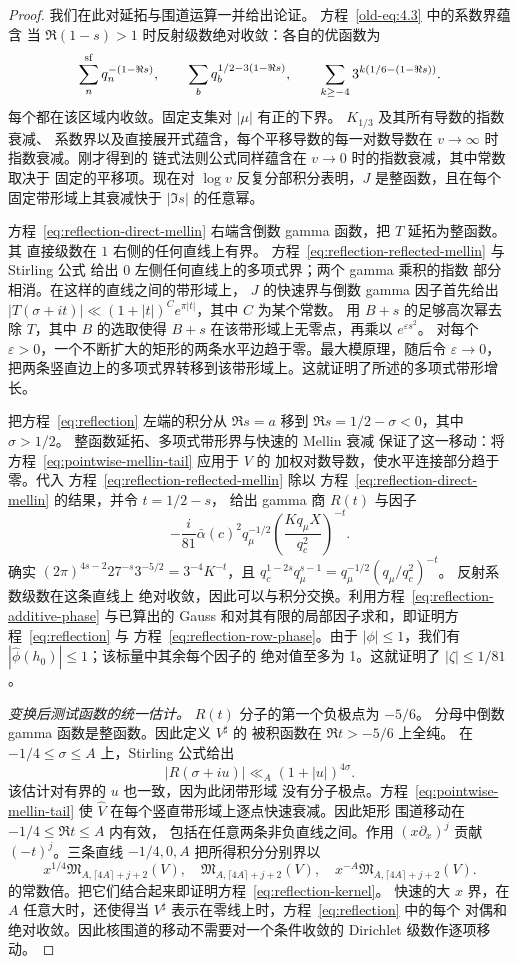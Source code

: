 \documentclass[11pt,a4paper]{article}
\numberwithin{equation}{section}
\numberwithin{figure}{section}
\theoremstyle{definition}
\theoremstyle{remark}
\begin{document}
\begin{proof}
我们在此对延拓与围道运算一并给出论证。
方程~\eqref{old-eq:4.3} 中的系数界蕴含
当 $\Re(1-s)>1$ 时反射级数绝对收敛：各自的优函数为
\[
 \sum_n^{\rm sf}q_n^{-(1-\Re s)},\qquad
 \sum_b q_b^{1/2-3(1-\Re s)},\qquad
 \sum_{k\ge-4}3^{k(1/6-(1-\Re s))}.
\]
每个都在该区域内收敛。固定支集对 $|\mu|$ 有正的下界。
$K_{1/3}$ 及其所有导数的指数衰减、
系数界以及直接展开式蕴含，每个平移导数的每一对数导数在
$v\to\infty$ 时指数衰减。刚才得到的
链式法则公式同样蕴含在 $v\to0$ 时的指数衰减，其中常数取决于
固定的平移项。现在对
$\log v$ 反复分部积分表明，$J$ 是整函数，且在每个固定带形域上其衰减快于
$|\Im s|$ 的任意幂。

方程~\eqref{eq:reflection-direct-mellin} 右端含倒数 gamma
函数，把 $T$ 延拓为整函数。其
直接级数在 $1$ 右侧的任何直线上有界。
方程~\eqref{eq:reflection-reflected-mellin} 与 Stirling 公式
给出 $0$ 左侧任何直线上的多项式界；两个 gamma 乘积的指数
部分相消。在这样的直线之间的带形域上，
$J$ 的快速界与倒数 gamma 因子首先给出
$|T(\sigma+it)|\ll (1+|t|)^C e^{\pi|t|}$，其中 $C$ 为某个常数。
用 $B+s$ 的足够高次幂去除 $T$，其中 $B$ 的选取使得
$B+s$ 在该带形域上无零点，再乘以 $e^{\varepsilon s^2}$。
对每个
$\varepsilon>0$，一个不断扩大的矩形的两条水平边趋于零。最大模原理，随后令
$\varepsilon\to0$，把两条竖直边上的多项式界转移到该带形域上。这就证明了所述的多项式带形增长。

把方程~\eqref{eq:reflection} 左端的积分从
$\Re s=a$ 移到 $\Re s=1/2-\sigma<0$，其中 $\sigma>1/2$。
整函数延拓、多项式带形界与快速的 Mellin 衰减
保证了这一移动：将方程~\eqref{eq:pointwise-mellin-tail} 应用于 $V$ 的
加权对数导数，使水平连接部分趋于零。代入
方程~\eqref{eq:reflection-reflected-mellin} 除以
方程~\eqref{eq:reflection-direct-mellin} 的结果，并令 $t=1/2-s$，
给出 gamma 商 $R(t)$ 与因子
\[
 -\frac i{81}\bar\alpha(c)^2q_\mu^{-1/2}
       \left(\frac{Kq_\mu X}{q_c^2}\right)^{-t}.
\]
确实 $(2\pi)^{4s-2}27^{-s}3^{-5/2}
=3^{-4}K^{-t}$，且 $q_c^{1-2s}q_\mu^{s-1}
=q_\mu^{-1/2}(q_\mu/q_c^2)^{-t}$。
反射系数级数在这条直线上
绝对收敛，因此可以与积分交换。利用方程~\eqref{eq:reflection-additive-phase}
与已算出的 Gauss 和对其有限的局部因子求和，即证明方程~\eqref{eq:reflection} 与
方程~\eqref{eq:reflection-row-phase}。由于 $|\phi|\le1$，我们有
$|\widehat\phi(h_0)|\le1$；该标量中其余每个因子的
绝对值至多为 1。这就证明了 $|\zeta|\le1/81$。

\emph{变换后测试函数的统一估计。}
$R(t)$ 分子的第一个负极点为 $-5/6$。
分母中倒数 gamma 函数是整函数。因此定义 $V^\sharp$ 的
被积函数在 $\Re t>-5/6$ 上全纯。
在 $-1/4\le\sigma\le A$ 上，Stirling 公式给出
\[
 |R(\sigma+iu)|\ll_A(1+|u|)^{4\sigma}.
\]
该估计对有界的 $u$ 也一致，因为此闭带形域
没有分子极点。方程~\eqref{eq:pointwise-mellin-tail} 使
$\widehat V$ 在每个竖直带形域上逐点快速衰减。因此矩形
围道移动在 $-1/4\le\Re t\le A$ 内有效，
包括在任意两条非负直线之间。作用
$(x\partial_x)^j$ 贡献 $(-t)^j$。三条直线
$-1/4,0,A$ 把所得积分分别界以
\[
 x^{1/4}\mathfrak M_{A,\lceil4A\rceil+j+2}(V),\quad
 \mathfrak M_{A,\lceil4A\rceil+j+2}(V),\quad
 x^{-A}\mathfrak M_{A,\lceil4A\rceil+j+2}(V).
\]
的常数倍。把它们结合起来即证明方程~\eqref{eq:reflection-kernel}。
快速的大 $x$ 界，在 $A$ 任意大时，还使得当
$V^\sharp$ 表示在零线上时，方程~\eqref{eq:reflection} 中的每个
对偶和绝对收敛。因此核围道的移动不需要对一个条件收敛的
Dirichlet 级数作逐项移动。


\end{proof}
\end{document}
